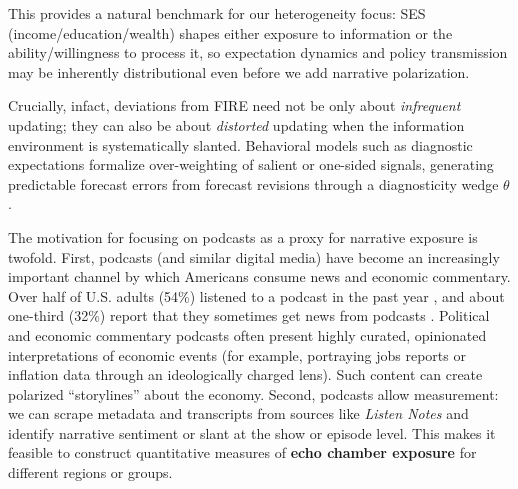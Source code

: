 \documentclass[12pt]{article}
\begin{document}
This provides a natural benchmark for our heterogeneity focus: SES (income/education/wealth) shapes either exposure to information or the ability/willingness to process it, so expectation dynamics and policy transmission may be inherently distributional even before we add narrative polarization.

Crucially, infact, deviations from FIRE need not be only about \emph{infrequent} updating; they can also be about \emph{distorted} updating when the information environment is systematically slanted. Behavioral models such as diagnostic expectations formalize over-weighting of salient or one-sided signals, generating predictable forecast errors from forecast revisions through a diagnosticity wedge $\theta$.


The motivation for focusing on podcasts as a proxy for narrative exposure is twofold. First, podcasts (and similar digital media) have become an increasingly important channel by which Americans consume news and economic commentary. Over half of U.S. adults (54\%) listened to a podcast in the past year \citep{pew_podcasts_news_fact_sheet_2025}, and about one-third (32\%) report that they sometimes get news from podcasts \citep{pew_podcasts_news_fact_sheet_2025}. Political and economic commentary podcasts often present highly curated, opinionated interpretations of economic events (for example, portraying jobs reports or inflation data through an ideologically charged lens). Such content can create polarized “storylines” about the economy. Second, podcasts allow measurement: we can scrape metadata and transcripts from sources like \textit{Listen Notes} and identify narrative sentiment or slant at the show or episode level. This makes it feasible to construct quantitative measures of \textbf{echo chamber exposure} for different regions or groups.
\end{document}
